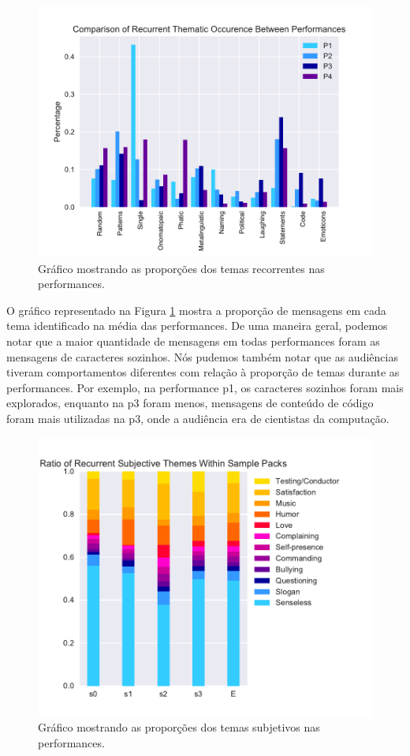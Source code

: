\begin{figure}[ht!]
\centering
\includegraphics[width=1\linewidth]{pictures/cap3/bar_plot_new_revised}
\caption{Gráfico mostrando as proporções dos temas recorrentes nas performances.}
\label{donut}
\end{figure}

O gráfico representado na Figura \ref{donut} mostra a proporção de mensagens em cada tema identificado na média das performances. De uma maneira geral, podemos notar que a maior quantidade de mensagens em todas performances foram as mensagens de caracteres sozinhos. Nós pudemos também notar que as audiências tiveram comportamentos diferentes com relação à proporção de temas durante as performances. Por exemplo, na performance p1, os caracteres sozinhos foram mais explorados, enquanto na p3 foram menos, mensagens de conteúdo de código foram mais utilizadas na p3, onde a audiência era de cientistas da computação.

\begin{figure}[ht!]
\centering
\includegraphics[width=1\linewidth]{pictures/cap3/subj_themes}
\caption{Gráfico mostrando as proporções dos temas subjetivos nas performances.}
\label{subj}
\end{figure}


